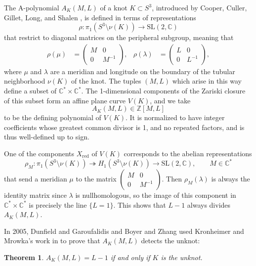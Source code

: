 \documentclass[11pt]{amsart}
\newtheorem {theorem}{Theorem}
\numberwithin{equation}{section}
\numberwithin{theorem}{section}
\theoremstyle{definition}
\newcommand{\Z}{\mathbb{Z}}
\newcommand{\C}{\mathbb{C}}
\newcommand\SL{\mathrm{SL}}
\begin{document}
The A-polynomial $A_K(M,L)$ of a knot $K \subset S^3$, introduced by Cooper, Culler, Gillet, Long, and Shalen \cite{ccgls}, is defined in terms of  representations
\[ \rho: \pi_1(S^3\setminus \nu(K)) \to \SL(2,\C) \]
that restrict to diagonal matrices on the peripheral subgroup, meaning that
\begin{align*}
\rho(\mu) &= \begin{pmatrix} M & 0 \\ 0 & M^{-1} \end{pmatrix}, &
\rho(\lambda) &= \begin{pmatrix} L & 0 \\ 0 & L^{-1} \end{pmatrix},
\end{align*} where $\mu$ and $\lambda$ are a meridian and longitude on the boundary of the tubular neighborhood $\nu(K)$ of the knot.
The tuples $(M,L)$ which arise in this way define a subset of $\C^\ast \times \C^\ast$. The 1-dimensional components of the Zariski closure of this subset form an affine plane curve $V(K)$, and we take \[A_K(M,L) \in \Z[M,L] \] to be the defining polynomial of $V(K)$. It is normalized to have integer coefficients whose greatest common divisor is 1, and no repeated factors, and is thus well-defined up to sign.

One of the components $X_\mathrm{red}$ of $V(K)$ corresponds to the abelian representations
\[ \rho_M: \pi_1(S^3\setminus \nu(K)) \twoheadrightarrow H_1(S^3\setminus \nu(K)) \to \SL(2,\C), \qquad M \in \C^\ast \]
that send a meridian $\mu$ to the matrix $\left(\begin{smallmatrix} M & 0 \\ 0 & M^{-1}\end{smallmatrix}\right)$.  Then $\rho_M(\lambda)$ is always the identity matrix since $\lambda$ is nullhomologous, so the image of this component in $\C^\ast\times\C^\ast$ is precisely the line $\{L=1\}$.  This shows that $L-1$ always divides $A_K(M,L)$.

In 2005, Dunfield and Garoufalidis \cite{dunfield-garoufalidis} and Boyer and Zhang \cite{boyer-zhang}  used Kronheimer and Mrowka's work in \cite{km-su2} to prove that $A_K(M,L)$ detects the unknot:

\begin{theorem} \label{thm:dg-bz-unknot}
 $A_K(M,L) = L-1$ if and only if $K$ is the unknot.
\end{theorem}
\end{document}
